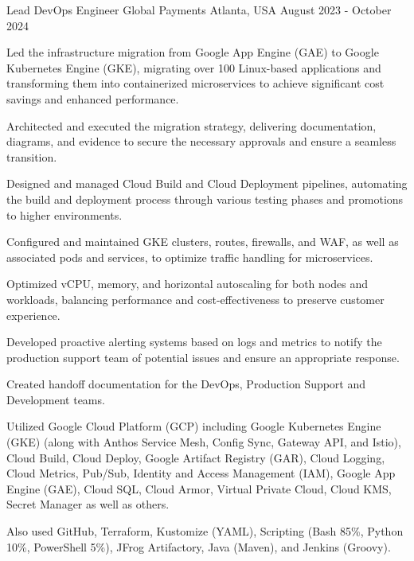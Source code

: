 \textcolor{awesome}{\raisebox{0.1\height}{\faBriefcase\thinspace}}


\begin{cventries}

  \cventry
    {Lead DevOps Engineer} %
    {Global Payments} %
    {Atlanta, USA} %
    {August 2023 - October 2024} %
    {
      \begin{cvitems} %
        \item {Led the infrastructure migration from Google App Engine (GAE) to Google Kubernetes Engine (GKE), migrating over 100 Linux-based applications and transforming them into containerized microservices to achieve significant cost savings and enhanced performance.}
        \item {Architected and executed the migration strategy, delivering documentation, diagrams, and evidence to secure the necessary approvals and ensure a seamless transition.}
        \item {Designed and managed Cloud Build and Cloud Deployment pipelines, automating the build and deployment process through various testing phases and promotions to higher environments.}
        \item {Configured and maintained GKE clusters, routes, firewalls, and WAF, as well as associated pods and services, to optimize traffic handling for microservices.}
        \item {Optimized vCPU, memory, and horizontal autoscaling for both nodes and workloads, balancing performance and cost-effectiveness to preserve customer experience.}
        \item {Developed proactive alerting systems based on logs and metrics to notify the production support team of potential issues and ensure an appropriate response.}
        \item {Created handoff documentation for the DevOps, Production Support and Development teams.}
        \item {Utilized Google Cloud Platform (GCP) including Google Kubernetes Engine (GKE) (along with Anthos Service Mesh, Config Sync, Gateway API, and Istio), Cloud Build, Cloud Deploy, Google Artifact Registry (GAR), Cloud Logging, Cloud Metrics, Pub/Sub, Identity and Access Management (IAM), Google App Engine (GAE), Cloud SQL, Cloud Armor, Virtual Private Cloud, Cloud KMS, Secret Manager as well as others.}
        \item {Also used GitHub, Terraform, Kustomize (YAML), Scripting (Bash 85\%, Python 10\%, PowerShell 5\%), JFrog Artifactory, Java (Maven), and Jenkins (Groovy).}
      \end{cvitems}
    }


\end{cventries}
